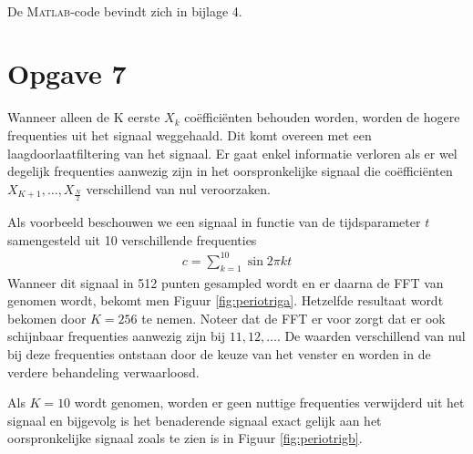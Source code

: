 \documentclass[a4paper]{article}
\newcommand{\opgave}[1]{\section*{Opgave #1}}
\begin{document}
\paragraph*{}
De \textsc{Matlab}-code bevindt zich in bijlage 4.
\opgave{7}
Wanneer alleen de K eerste $X_k$ co\"{e}ffici\"{e}nten behouden worden, worden de hogere frequenties uit het signaal weggehaald. Dit komt overeen met een laagdoorlaatfiltering van het signaal. Er gaat enkel informatie verloren als er wel degelijk frequenties aanwezig zijn in het oorspronkelijke signaal die co\"{e}ffici\"{e}nten $X_{K+1}, \dots ,X_{\frac{N}{2}}$ verschillend van nul veroorzaken.

Als voorbeeld beschouwen we een signaal in functie van de tijdsparameter $t$ samengesteld uit 10 verschillende frequenties
\begin{align}
c=\sum_{k=1}^{10} \sin{2\pi kt}
\end{align}
Wanneer dit signaal in 512 punten gesampled wordt en er daarna de FFT van genomen wordt, bekomt men Figuur \ref{fig:periotriga}. Hetzelfde resultaat wordt bekomen door $K=256$ te nemen. Noteer dat de FFT er voor zorgt dat er ook schijnbaar frequenties aanwezig zijn bij $11,12,\dots$. De waarden verschillend van nul bij deze frequenties ontstaan door de keuze van het venster en worden in de verdere behandeling verwaarloosd.

Als $K=10$ wordt genomen, worden er geen nuttige frequenties verwijderd uit het signaal en bijgevolg is het benaderende signaal exact gelijk aan het oorspronkelijke signaal zoals te zien is in Figuur \ref{fig:periotrigb}.
\end{document}
